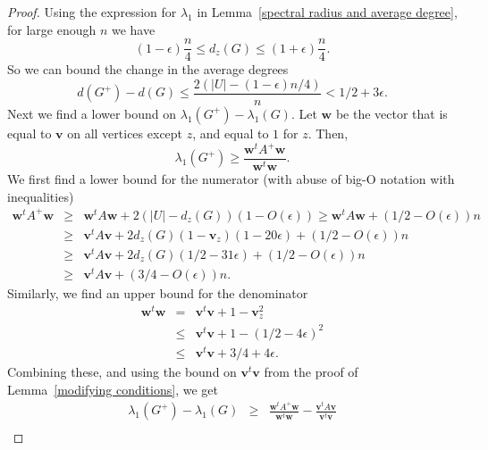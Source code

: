 \begin{proof}
\noindent Using the expression for $\lambda_1$ in Lemma~\ref{spectral radius and average degree}, for large enough $n$ we have
 \[ \left(1-\epsilon\right)\frac{n}{4} \leq d_z(G) \leq \left(1+\epsilon\right) \frac{n}{4} .\]
So we can bound the change in the average degrees
 \[ d(G^+) - d(G) \leq \frac{2(|U| - (1-\epsilon)n/4)}{n}< 1/2 + 3\epsilon .\]
 Next we find a lower bound on $\lambda_1(G^+) - \lambda_1(G)$.
 Let $\textbf{w}$ be the vector that is equal to $\textbf{v}$ on all 
vertices except $z$, and equal to $1$ for $z$.  Then, 
 \[ \lambda_1(G^+) \geq \frac{\textbf{w}^tA^+\textbf{w}}{\textbf{w}^t\textbf{w}} .\] 
We first find a lower bound for the numerator (with abuse of big-O notation with inequalities)
\begin{eqnarray*} 
\textbf{w}^tA^+\textbf{w} & \geq & \textbf{w}^tA\textbf{w} + 2(|U| - d_z(G))(1-O(\epsilon)) \geq \textbf{w}^tA\textbf{w} + (1/2-O(\epsilon))n \\
& \geq &  \textbf{v}^tA\textbf{v} + 2d_z(G) \left(1-\mathbf{v}_z\right)(1-20\epsilon) + (1/2-O(\epsilon))n \\
& \geq &  \textbf{v}^tA\textbf{v} + 2d_z(G) \left(1/2 - 31\epsilon\right) + (1/2-O(\epsilon))n \\
& \geq &  \textbf{v}^tA\textbf{v} + (3/4-O(\epsilon))n .
\end{eqnarray*}
Similarly, we find an upper bound for the denominator
\begin{eqnarray*}
\textbf{w}^t \textbf{w} &=& \textbf{v}^t\textbf{v} + 1 - \mathbf{v}_z^2 \\
&\leq& \textbf{v}^t\textbf{v} + 1 - (1/2 - 4\epsilon)^2 \\
&\leq& \textbf{v}^t\textbf{v} + 3/4 + 4\epsilon .
\end{eqnarray*}
Combining these, and using the bound on $\textbf{v}^t\textbf{v}$ from
the proof of Lemma~\ref{modifying conditions}, we get
\begin{eqnarray*}
 \lambda_1(G^+) - \lambda_1(G) &\geq& \frac{\textbf{w}^tA^+\textbf{w}}{\textbf{w}^t\textbf{w}} - \frac{\textbf{v}^tA\textbf{v}}{\textbf{v}^t\textbf{v}}\\

\end{eqnarray*}
\end{proof}
